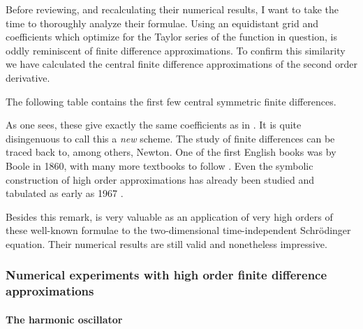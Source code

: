 Before reviewing, and recalculating their numerical results, I want to take the time to thoroughly analyze their formulae. Using an equidistant grid and coefficients which optimize for the Taylor series of the function in question, is oddly reminiscent of finite difference approximations. To confirm this similarity we have calculated the central finite difference approximations of the second order derivative.

The following table contains the first few central symmetric finite differences.
\begin{center}
    
\end{center}

As one sees, these give exactly the same coefficients as in \cite{wang_new_2009}. It is quite disingenuous to call this a \emph{new} scheme. The study of finite differences can be traced back to, among others, Newton. One of the first English books was by Boole \cite{boole_calculus_1860} in 1860, with many more textbooks to follow \cite{thomson_calculus_1933,jordan_calculus_1965}. Even the symbolic construction of high order approximations has already been studied and tabulated as early as 1967 \cite{ballester_construction_1967,keller_symbolic_1978,fornberg_generation_1988}.

Besides this remark, \cite{wang_new_2009} is very valuable as an application of very high orders of these well-known formulae to the two-dimensional time-independent Schrödinger equation. Their numerical results are still valid and nonetheless impressive.

\subsubsection{Numerical experiments with high order finite difference approximations}\label{sec:c4_fd_numerical}

\paragraph{The harmonic oscillator}

